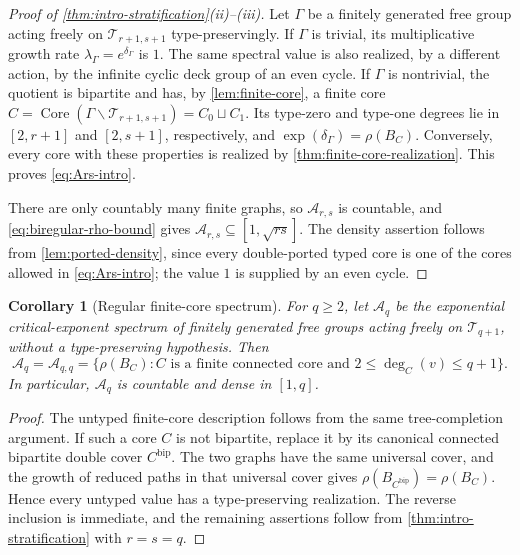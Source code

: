 \documentclass[11pt]{amsart}
\theoremstyle{plain}
\newtheorem{corollary}[theorem]{Corollary}
\theoremstyle{definition}
\theoremstyle{remark}
\newcommand{\T}{\mathcal T}
\newcommand{\Core}{\operatorname{Core}}
\newcommand{\cA}{\mathcal A}
\begin{document}
\begin{proof}[Proof of \cref{thm:intro-stratification}\textup{(ii)--(iii)}]
Let \(\Gamma\) be a finitely generated free group acting freely on
\(\T_{r+1,s+1}\) type-preservingly.  If \(\Gamma\) is trivial, its
multiplicative growth rate \(\lambda_\Gamma=e^{\delta_\Gamma}\) is \(1\).  The same spectral value is also
realized, by a different action, by the infinite cyclic deck group of an even
cycle.  If \(\Gamma\) is nontrivial, the quotient is bipartite and has, by
\cref{lem:finite-core}, a
finite core \(C=\Core(\Gamma\backslash\T_{r+1,s+1})=C_0\sqcup C_1\).  Its type-zero and type-one degrees
lie in \([2,r+1]\) and \([2,s+1]\), respectively, and
\(\exp(\delta_\Gamma)=\rho(B_C)\).  Conversely, every core with these
properties is realized by \cref{thm:finite-core-realization}.  This proves
\eqref{eq:Ars-intro}.

There are only countably many finite graphs, so \(\cA_{r,s}\) is countable,
and \eqref{eq:biregular-rho-bound} gives
\(\cA_{r,s}\subseteq[1,\sqrt{rs}]\).  The density assertion follows from
\cref{lem:ported-density}, since every double-ported typed core is one of the
cores allowed in \eqref{eq:Ars-intro}; the value \(1\) is supplied by an
even cycle.
\end{proof}

\begin{corollary}[Regular finite-core spectrum]
\label{cor:regular-finite-core-spectrum}
For \(q\geq2\), let \(\cA_q\) be the exponential critical-exponent spectrum
of finitely generated free groups acting freely on \(\T_{q+1}\), without a
type-preserving hypothesis.  Then
\[
  \cA_q=\cA_{q,q}
  =\{\rho(B_C):C\text{ is a finite connected core and }
      2\leq\deg_C(v)\leq q+1\}.
\]
In particular, \(\cA_q\) is countable and dense in \([1,q]\).
\end{corollary}

\begin{proof}
The untyped finite-core description follows from the same tree-completion
argument.  If such a core \(C\) is not bipartite, replace it by its canonical
connected bipartite double cover \(C^{\mathrm{bip}}\).  The two graphs have
the same universal cover, and the growth of reduced paths in that universal
cover gives
\(\rho(B_{C^{\mathrm{bip}}})=\rho(B_C)\).  Hence every untyped value has a
type-preserving realization.  The reverse inclusion is immediate, and the
remaining assertions follow from \cref{thm:intro-stratification} with
\(r=s=q\).
\end{proof}
\end{document}
